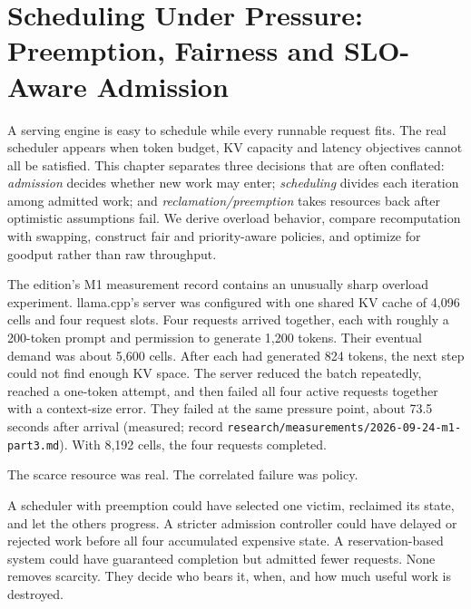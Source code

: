 \chapter{Scheduling Under Pressure: Preemption, Fairness and SLO-Aware Admission}\label{ch:scheduling}

\begin{ChapterIntent}
A serving engine is easy to schedule while every runnable request fits. The real
scheduler appears when token budget, KV capacity and latency objectives cannot all be
satisfied. This chapter separates three decisions that are often conflated:
\emph{admission} decides whether new work may enter; \emph{scheduling} divides each
iteration among admitted work; and \emph{reclamation/preemption} takes resources back
after optimistic assumptions fail. We derive overload behavior, compare recomputation
with swapping, construct fair and priority-aware policies, and optimize for goodput
rather than raw throughput.
\end{ChapterIntent}


The edition's M1 measurement record contains an unusually sharp overload experiment.
llama.cpp's server was configured with one shared KV cache of 4,096 cells and four
request slots. Four requests arrived together, each with roughly a 200-token prompt
and permission to generate 1,200 tokens. Their eventual demand was about 5,600 cells.
After each had generated 824 tokens, the next step could not find enough KV space.
The server reduced the batch repeatedly, reached a one-token attempt, and then failed
all four active requests together with a context-size error. They failed at the same
pressure point, about 73.5 seconds after arrival (measured; record
\texttt{research/measurements/2026-09-24-m1-part3.md}). With 8,192 cells, the four
requests completed.

The scarce resource was real. The correlated failure was policy.

A scheduler with preemption could have selected one victim, reclaimed its state, and
let the others progress. A stricter admission controller could have delayed or
rejected work before all four accumulated expensive state. A reservation-based system
could have guaranteed completion but admitted fewer requests. None removes scarcity.
They decide who bears it, when, and how much useful work is destroyed.

